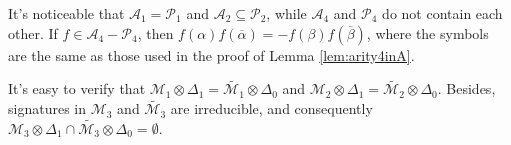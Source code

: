 \documentclass[a4paper,UKenglish,cleveref, autoref, thm-restate]{lipics-v2021}
\begin{document}
\begin{remark}\label{remarkA4-P4}
It's noticeable that $\mathscr{A}_1=\mathscr{P}_1$ and $\mathscr{A}_2\subseteq\mathscr{P}_2$, while $\mathscr{A}_4$ and $\mathscr{P}_4$ do not contain each other. If $f\in\mathscr{A}_4-\mathscr{P}_4$, then $f(\alpha)f(\overline{\alpha})=-f(\beta)f(\overline{\beta})$, where the symbols are the same as those used in the proof of Lemma \ref{lem:arity4inA}.
\end{remark}

\begin{remark}\label{remark:difference between M and M'}


It's easy to verify that $\mathscr{M}_1\otimes\Delta_1=\widetilde{\mathscr{M}_1}\otimes\Delta_0$ and $\mathscr{M}_2\otimes\Delta_1=\widetilde{\mathscr{M}_2}\otimes\Delta_0$. Besides, signatures in $\mathscr{M}_3$ and $\widetilde{\mathscr{M}_3}$ are irreducible, and consequently $\mathscr{M}_3\otimes\Delta_1\cap\widetilde{\mathscr{M}_3}\otimes\Delta_0=\emptyset$.
\end{remark}
\end{document}
